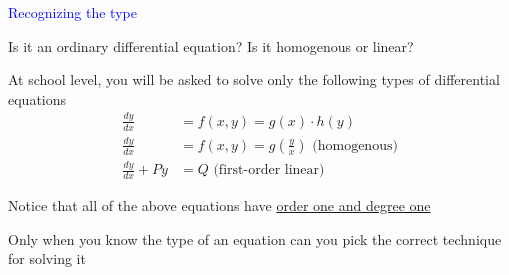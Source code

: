 \documentclass[14pt,fleqn]{extarticle}
\begin{document}
\begin{skill}
\textcolor{blue}{Recognizing the type}

Is it an ordinary differential equation?
Is it homogenous or linear? 
\end{skill}

%

\newcard

At school level, you will be asked 
to solve only the following types of
differential equations 
% 
\begin{align}
\frac{dy}{dx} &= f(x,y) = g(x)\cdot h(y) \\
\frac{dy}{dx} &= f(x,y) = g\left(\frac{y}{x}\right)\text{ (homogenous)} \\
\frac{dy}{dx} + Py &= Q  \text{ (first-order linear)}
\end{align}\newline 

Notice that all of the above equations
have \underline{order one and degree one}\newline 

Only when you know the type of an equation can you pick the correct technique for solving it
%
\end{document}
